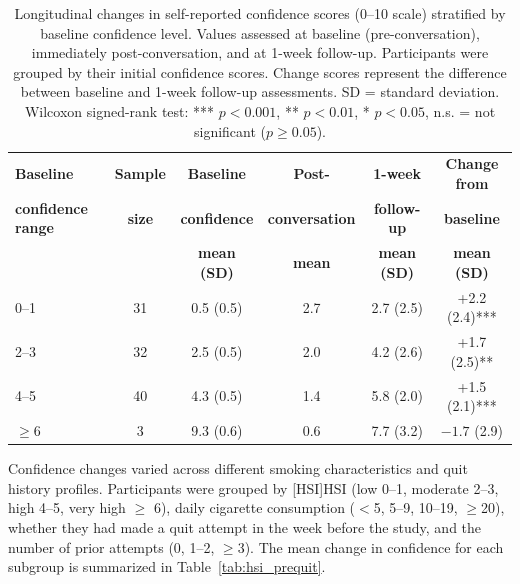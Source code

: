 \begin{table}[ht!]
  \centering
  \small
  \renewcommand{\arraystretch}{1.1}
  \begin{tabular*}{\linewidth}{@{\extracolsep{\fill}}lccccc@{}}
    \toprule
    \textbf{Baseline} & \textbf{Sample} & \textbf{Baseline} & \textbf{Post-} & \textbf{1-week} & \textbf{Change from} \\
    \textbf{confidence range} & \textbf{size} & \textbf{confidence} & \textbf{conversation} & \textbf{follow-up} & \textbf{baseline} \\
    & & \textbf{mean (SD)} & \textbf{mean} & \textbf{mean (SD)} & \textbf{mean (SD)} \\
    \midrule
    0--1   & 31 & 0.5 (0.5) & 2.7 & 2.7 (2.5) & +2.2 (2.4)*** \\
    2--3   & 32 & 2.5 (0.5) & 2.0 & 4.2 (2.6) & +1.7 (2.5)** \\
    4--5   & 40 & 4.3 (0.5) & 1.4 & 5.8 (2.0) & +1.5 (2.1)*** \\
    $\geq$6 & 3 & 9.3 (0.6) & 0.6 & 7.7 (3.2) & $-1.7$ (2.9) \\
    \bottomrule
  \end{tabular*}
  \caption{Longitudinal changes in self-reported confidence scores (0--10 scale) stratified by baseline confidence level. Values assessed at baseline (pre-conversation), immediately post-conversation, and at 1-week follow-up. Participants were grouped by their initial confidence scores. Change scores represent the difference between baseline and 1-week follow-up assessments. SD = standard deviation. Wilcoxon signed-rank test: *** $p < 0.001$, ** $p < 0.01$, * $p < 0.05$, n.s. = not significant ($p \geq 0.05$).}
  \label{tab:baseline_confidence}
\end{table}




Confidence changes varied across different smoking characteristics and quit history profiles. Participants were grouped by [HSI]HSI (low 0--1, moderate 2--3, high 4--5, very high $\geq$ 6), daily cigarette consumption ($<$5, 5--9, 10--19, $\geq$20), whether they had made a quit attempt in the week before the study, and the number of prior attempts (0, 1--2, $\geq$3). The mean change in confidence for each subgroup is summarized in Table~\ref{tab:hsi_prequit}.

